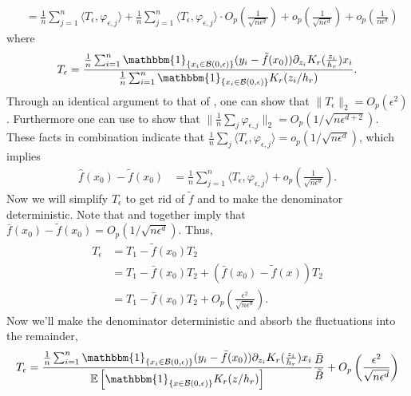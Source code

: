 \documentclass[11pt]{article}
\begin{document}
\begin{appendices}
\begin{align*}
    &= \frac{1}{n}\sum_{j = 1}^n\langle T_{\epsilon}, \varphi_{\epsilon, j}\rangle + \frac{1}{n}\sum_{j = 1}^n\langle T_{\epsilon}, \varphi_{\epsilon, j}\rangle \cdot O_p\left(\frac{1}{\sqrt{n\epsilon^d}}\right) + o_p\left(\frac{1}{\sqrt{n\epsilon^{d}}} \right) + o_p\left(\frac{1}{n\epsilon^{d}}\right)
\end{align*}
where
\begin{equation*}
    T_{\epsilon} = \frac{\frac{1}{n}\sum_{i = 1}^n\mathbbm{1}_{\{x_i \in \mathcal{B}(0, \epsilon)\}}(y_i - \tilde{f}(x_0))\partial_{z_i}K_r(\frac{z_i}{h_r})x_i}{\frac{1}{n}\sum_{i = 1}^n\mathbbm{1}_{\{x_i \in \mathcal{B}(0, \epsilon)\}}K_r(z_i/h_r)}.
\end{equation*}
Through an identical argument to that of , one can show that $\|T_{\epsilon}\|_2 = O_p(\epsilon^2)$. Furthermore one can use  to show that $\|\frac{1}{n}\sum_j\varphi_{\epsilon,j}\|_2 = O_p(1/\sqrt{n\epsilon^{d+2}})$. These facts in combination indicate that $\frac{1}{n}\sum_j\langle T_{\epsilon}, \varphi_{\epsilon,j}\rangle = o_p(1/\sqrt{n\epsilon^d})$, which implies
\begin{align*}
    \hat{f}(x_0) - \tilde{f}(x_0) &= \frac{1}{n}\sum_{j = 1}^n\langle T_{\epsilon}, \varphi_{\epsilon,j }\rangle + o_p\left(\frac{1}{\sqrt{n\epsilon^{d}}} \right).
\end{align*}
Now we will simplify $T_{\epsilon}$ to get rid of $\tilde{f}$ and to make the denominator deterministic. Note that  and  together imply that $\bar{f}(x_0) - \tilde f(x_0) = O_p(1/\sqrt{n\epsilon^{d}})$. Thus,
\begin{align*}
    T_{\epsilon} &= T_1 - \tilde{f}(x_0)T_2 \\
    &= T_1 - \bar{f}(x_0)T_2 + (\bar{f}(x_0) - \tilde{f}(x))T_2 \\
    &= T_1 - \bar{f}(x_0)T_2 + O_p\left(\frac{\epsilon^2}{\sqrt{n\epsilon^d}}\right).
\end{align*}
Now we'll make the denominator deterministic and absorb the fluctuations into the remainder,
\begin{align*}
    T_{\epsilon} &= \frac{\frac{1}{n}\sum_{i = 1}^n\mathbbm{1}_{\{x_i \in \mathcal{B}(0, \epsilon)\}}(y_i - \bar{f}(x_0))\partial_{z_i}K_r(\frac{z_i}{h_r})x_i}{\mathbb{E}\left[\mathbbm{1}_{\{x \in \mathcal{B}(0, \epsilon)\}}K_r(z/h_r)\right]}\frac{\bar{B}}{\tilde{B}} + O_p\left(\frac{\epsilon^2}{\sqrt{n\epsilon^d}}\right) \\

\end{align*}
\end{appendices}
\end{document}
